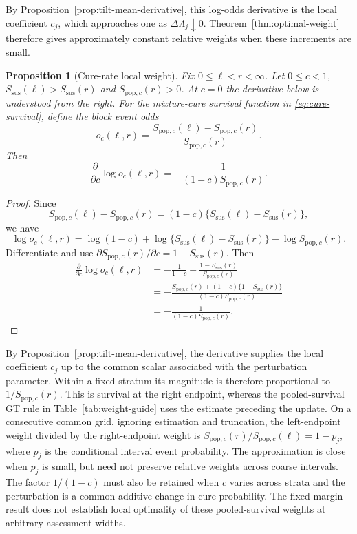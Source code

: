 \documentclass[12pt]{article}
\newtheorem{proposition}[theorem]{Proposition}
\theoremstyle{definition}
\theoremstyle{remark}
\begin{document}
By Proposition~\ref{prop:tilt-mean-derivative}, this log-odds derivative is the local coefficient $c_j$, which approaches one as $\Delta\Lambda_j\downarrow0$. Theorem~\ref{thm:optimal-weight} therefore gives approximately constant relative weights when these increments are small.

\begin{proposition}[Cure-rate local weight]
Fix $0\leq\ell<r<\infty$. Let $0\leq c<1$, $S_{\mathrm{sus}}(\ell)>S_{\mathrm{sus}}(r)$ and $S_{\mathrm{pop},c}(r)>0$. At $c=0$ the derivative below is understood from the right. For the mixture-cure survival function in \eqref{eq:cure-survival}, define the block event odds
\[
 o_c(\ell,r)=\frac{S_{\mathrm{pop},c}(\ell)-S_{\mathrm{pop},c}(r)}
 {S_{\mathrm{pop},c}(r)}.
\]
Then
\[
 \frac{\partial}{\partial c}\log o_c(\ell,r)
 =-\frac{1}{(1-c)S_{\mathrm{pop},c}(r)}.
\]
\end{proposition}

\begin{proof}
Since
\[
 S_{\mathrm{pop},c}(\ell)-S_{\mathrm{pop},c}(r)
 =(1-c)\{S_{\mathrm{sus}}(\ell)-S_{\mathrm{sus}}(r)\},
\]
we have
\[
 \log o_c(\ell,r)=\log(1-c)
 +\log\{S_{\mathrm{sus}}(\ell)-S_{\mathrm{sus}}(r)\}
 -\log S_{\mathrm{pop},c}(r).
\]
Differentiate and use
$\partial S_{\mathrm{pop},c}(r)/\partial c=1-S_{\mathrm{sus}}(r)$. Then
\begin{align*}
 \frac{\partial}{\partial c}\log o_c(\ell,r)
 &=-\frac{1}{1-c}
   -\frac{1-S_{\mathrm{sus}}(r)}{S_{\mathrm{pop},c}(r)}\\
 &=-\frac{S_{\mathrm{pop},c}(r)+(1-c)\{1-S_{\mathrm{sus}}(r)\}}
 {(1-c)S_{\mathrm{pop},c}(r)}\\
 &=-\frac{1}{(1-c)S_{\mathrm{pop},c}(r)}.
\end{align*}
\end{proof}

By Proposition~\ref{prop:tilt-mean-derivative}, the derivative supplies the local coefficient $c_j$ up to the common scalar associated with the perturbation parameter. Within a fixed stratum its magnitude is therefore proportional to $1/S_{\mathrm{pop},c}(r)$. This is survival at the right endpoint, whereas the pooled-survival GT rule in Table~\ref{tab:weight-guide} uses the estimate preceding the update. On a consecutive common grid, ignoring estimation and truncation, the left-endpoint weight divided by the right-endpoint weight is $S_{\mathrm{pop},c}(r)/S_{\mathrm{pop},c}(\ell)=1-p_j$, where $p_j$ is the conditional interval event probability. The approximation is close when $p_j$ is small, but need not preserve relative weights across coarse intervals. The factor $1/(1-c)$ must also be retained when $c$ varies across strata and the perturbation is a common additive change in cure probability. The fixed-margin result does not establish local optimality of these pooled-survival weights at arbitrary assessment widths.
\end{document}
